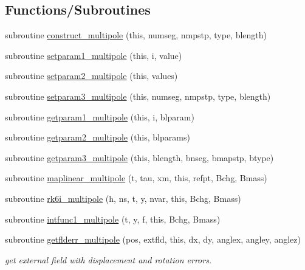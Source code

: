 \subsection*{Functions/\+Subroutines}
\begin{DoxyCompactItemize}
\item 
subroutine \mbox{\hyperlink{namespacemultipoleclass_acce84c33b6ef25e4e2ee0572faa92b60}{construct\+\_\+multipole}} (this, numseg, nmpstp, type, blength)
\item 
subroutine \mbox{\hyperlink{namespacemultipoleclass_a85869614f5049e8bb17c4f195011fca5}{setparam1\+\_\+multipole}} (this, i, value)
\item 
subroutine \mbox{\hyperlink{namespacemultipoleclass_ac9e1b3b044ae69816a92317bcfd1bc05}{setparam2\+\_\+multipole}} (this, values)
\item 
subroutine \mbox{\hyperlink{namespacemultipoleclass_ad752ec84fa7145abc1b9130eb8654867}{setparam3\+\_\+multipole}} (this, numseg, nmpstp, type, blength)
\item 
subroutine \mbox{\hyperlink{namespacemultipoleclass_afc5919c9854c17e95241242284635eaf}{getparam1\+\_\+multipole}} (this, i, blparam)
\item 
subroutine \mbox{\hyperlink{namespacemultipoleclass_a4ee9aad22a430e9de1e1abb8ea21b058}{getparam2\+\_\+multipole}} (this, blparams)
\item 
subroutine \mbox{\hyperlink{namespacemultipoleclass_a75142a086a96c998e2ce878857d50179}{getparam3\+\_\+multipole}} (this, blength, bnseg, bmapstp, btype)
\item 
subroutine \mbox{\hyperlink{namespacemultipoleclass_ab9ed6db5fa3b4ea0f6e1a07cd6d57431}{maplinear\+\_\+multipole}} (t, tau, xm, this, refpt, Bchg, Bmass)
\item 
subroutine \mbox{\hyperlink{namespacemultipoleclass_aebbed53759ae97dc55df35264c89274c}{rk6i\+\_\+multipole}} (h, ns, t, y, nvar, this, Bchg, Bmass)
\item 
subroutine \mbox{\hyperlink{namespacemultipoleclass_adba27354e821268f6cb786c415a5bc91}{intfunc1\+\_\+multipole}} (t, y, f, this, Bchg, Bmass)
\item 
subroutine \mbox{\hyperlink{namespacemultipoleclass_ade719df1a7d0e47f6495032cb64b1450}{getflderr\+\_\+multipole}} (pos, extfld, this, dx, dy, anglex, angley, anglez)
\begin{DoxyCompactList}\small\item\em get external field with displacement and rotation errors. \end{DoxyCompactList}\item 

\end{DoxyCompactItemize}

